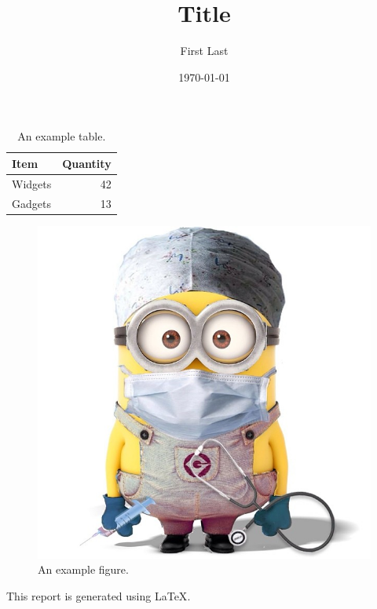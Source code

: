 \documentclass{article}
\begin{document}
\title{\textsf{Title}}
\author{First Last}
\date{\today}
\maketitle



\begin{table}[H]
\centering
\begin{tabular}{l|r}
Item & Quantity \\\hline
Widgets & 42 \\
Gadgets & 13
\end{tabular}
\caption{\label{tab:widgets}An example table.}
\end{table}


\begin{figure}[H]
\begin{center}
\includegraphics[scale=0.2]{figure.jpg}
\caption{An example figure.}
\end{center}
\end{figure}


This report is generated using \LaTeX \cite{knuth1986texbook}.



\end{document}
